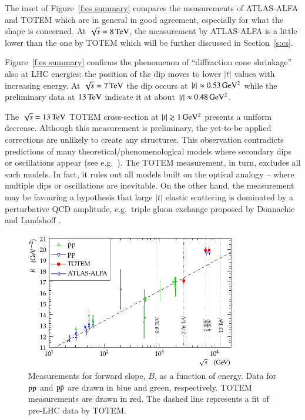 \documentclass{webofc}
\def\un#1{\,{\rm #1}}
\begin{document}
The inset of Figure~\ref{f:es summary} compares the measurements of ATLAS-ALFA and TOTEM which are in general in good agreement, especially for what the shape is concerned. At $\sqrt s = 8\un{TeV}$, the measurement by ATLAS-ALFA is a little lower than the one by TOTEM which will be further discussed in Section~\ref{s:cs}.

Figure~\ref{f:es summary} confirms the phenomenon of ``diffraction cone shrinkage'' also at LHC energies: the position of the dip moves to lower $|t|$ values with increasing energy. At $\sqrt s = 7\un{TeV}$ the dip occurs at $|t| \approx 0.53\un{GeV^2}$ while the preliminary data at $13\un{TeV}$ indicate it at about $|t| \approx 0.48\un{GeV^2}$.

The $\sqrt s = 13\un{TeV}$ TOTEM cross-section at $|t| \gtrsim 1\un{GeV^2}$ presents a uniform decrease. Although this measurement is preliminary, the yet-to-be applied corrections are unlikely to create any structures. This observation contradicts predictions of many theoretical/phenomenological models where secondary dips or oscillations appear (see e.g.~\cite{elegent}). The TOTEM measurement, in turn, excludes all such models. In fact, it rules out all models built on the optical analogy -- where multiple dips or oscillations are inevitable. On the other hand, the measurement may be favouring a hypothesis that large $|t|$ elastic scattering is dominated by a perturbative QCD amplitude, e.g.~triple gluon exchange proposed by Donnachie and Landshoff \cite{donnachie-landshoff}.

\begin{figure}[h]
\centering
\includegraphics[height=6cm,clip]{fig/es_B_vs_s.pdf}
\vskip-4mm
\caption{Measurements for forward slope, $B$, as a function of energy. Data for $\rm pp$ and $\rm p\bar p$ are drawn in blue and green, respectively. TOTEM measurements are drawn in red. The dashed line represents a fit of pre-LHC data \cite{b-vs-s-data} by TOTEM.}
\label{f:es B}
\end{figure}
\end{document}

